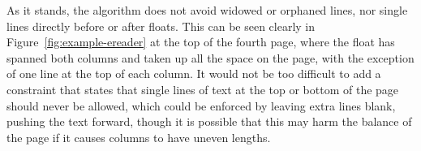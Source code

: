 As it stands, the algorithm does not avoid widowed or orphaned lines, nor single lines directly before or after floats. This can be seen clearly in Figure~\ref{fig:example-ereader} at the top of the fourth page, where the float has spanned both columns and taken up all the space on the page, with the exception of one line at the top of each column. It would not be too difficult to add a constraint that states that single lines of text at the top or bottom of the page should never be allowed, which could be enforced by leaving extra lines blank, pushing the text forward, though it is possible that this may harm the balance of the page if it causes columns to have uneven lengths.

\begin{figure}
\begin{center}
\hspace{0.01\textwidth}


\end{center}
\end{figure}
